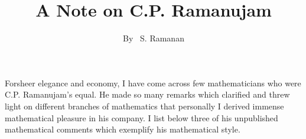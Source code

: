 \title{A Note on C.P. Ramanujam}

\author{By~ S. Ramanan}

\date{}
\maketitle

\setcounter{page}{13}
\setcounter{pageoriginal}{10}
For\pageoriginale sheer elegance and economy, I have come across few 
mathematicians who were C.P. Ramanujam's equal. He made so many 
remarks which clarified and threw light on different branches of 
mathematics that personally I derived immense mathematical pleasure in 
his company. I list below three of his unpublished mathematical 
comments which exemplify his mathematical style.
